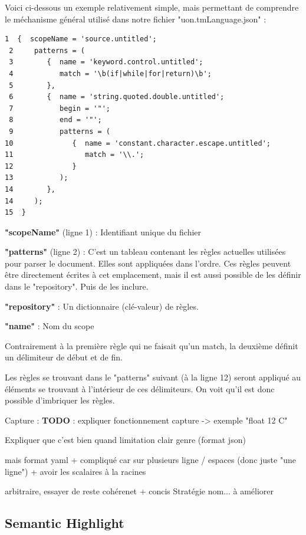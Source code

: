 \documentclass[
    iict, %
    il, %
]{heig-tb}
\begin{document}
Voici ci-dessous un exemple relativement simple, mais permettant de comprendre le méchanisme général utilisé dans notre fichier "uon.tmLanguage.json" :
\begin{lstlisting}[frame=single, caption={Textmate grammar},label={Textmate grammar}]
 1  {  scopeName = 'source.untitled';
 2     patterns = (
 3        {  name = 'keyword.control.untitled';
 4           match = '\b(if|while|for|return)\b';
 5        },
 6        {  name = 'string.quoted.double.untitled';
 7           begin = '"';
 8           end = '"';
 9           patterns = (
10              {  name = 'constant.character.escape.untitled';
11                 match = '\\.';
12              }
13           );
14        },
14     );
15  }
\end{lstlisting}
\textbf{"scopeName"} (ligne 1) : Identifiant unique du fichier

\textbf{"patterns"} (ligne 2) : C'est un tableau contenant les règles actuelles utilisées pour parser le document. Elles sont appliquées dans l'ordre.
Ces règles peuvent être directement écrites à cet emplacement, mais il est aussi possible de les définir dans le "repository". Puis de les inclure.

\textbf{"repository"} : Un dictionnaire (clé-valeur) de règles.

\textbf{"name"} : Nom du scope

Contrairement à la première règle qui ne faisait qu'un match, la deuxième définit un délimiteur de début et de fin.

Les règles se trouvant dans le "patterns" suivant (à la ligne 12) seront appliqué au éléments se trouvant à l'intérieur de ces délimiteurs. On voit qu'il est donc possible d'imbriquer les règles.

Capture : \textbf{TODO} : expliquer fonctionnement capture -> exemple "float 12 C"

Expliquer que c'est bien quand limitation clair genre {} (format json)

mais format yaml + compliqué car sur plusieurs ligne / espaces (donc juste "une ligne")
+ avoir les scalaires à la racines

arbitraire, essayer de reste cohérenet + concis
Stratégie nom... à améliorer

\subsection{Semantic Highlight}
\end{document}
